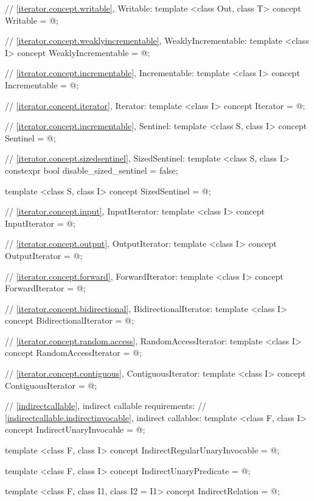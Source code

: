 \begin{codeblock}
{  // \ref{iterator.concept.writable}, Writable:
  template <class Out, class T>
  concept Writable = @\seebelow@;

  // \ref{iterator.concept.weaklyincrementable}, WeaklyIncrementable:
  template <class I>
  concept WeaklyIncrementable = @\seebelow@;

  // \ref{iterator.concept.incrementable}, Incrementable:
  template <class I>
  concept Incrementable = @\seebelow@;

  // \ref{iterator.concept.iterator}, Iterator:
  template <class I>
  concept Iterator = @\seebelow@;

  // \ref{iterator.concept.incrementable}, Sentinel:
  template <class S, class I>
  concept Sentinel = @\seebelow@;

  // \ref{iterator.concept.sizedsentinel}, SizedSentinel:
  template <class S, class I>
  constexpr bool disable_sized_sentinel = false;

  template <class S, class I>
  concept SizedSentinel = @\seebelow@;

  // \ref{iterator.concept.input}, InputIterator:
  template <class I>
  concept InputIterator = @\seebelow@;

  // \ref{iterator.concept.output}, OutputIterator:
  template <class I>
  concept OutputIterator = @\seebelow@;

  // \ref{iterator.concept.forward}, ForwardIterator:
  template <class I>
  concept ForwardIterator = @\seebelow@;

  // \ref{iterator.concept.bidirectional}, BidirectionalIterator:
  template <class I>
  concept BidirectionalIterator = @\seebelow@;

  // \ref{iterator.concept.random.access}, RandomAccessIterator:
  template <class I>
  concept RandomAccessIterator = @\seebelow@;

  // \ref{iterator.concept.contiguous}, ContiguousIterator:
  template <class I>
  concept ContiguousIterator = @\seebelow@;

  // \ref{indirectcallable}, indirect callable requirements:
  // \ref{indirectcallable.indirectinvocable}, indirect callables:
  template <class F, class I>
  concept IndirectUnaryInvocable = @\seebelow@;

  template <class F, class I>
  concept IndirectRegularUnaryInvocable = @\seebelow@;

  template <class F, class I>
  concept IndirectUnaryPredicate = @\seebelow@;

  template <class F, class I1, class I2 = I1>
  concept IndirectRelation = @\seebelow@;

}
\end{codeblock}
